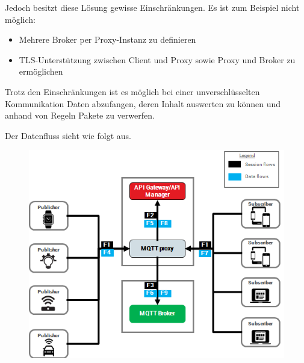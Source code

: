         Jedoch besitzt diese Lösung gewisse Einschränkungen.
        Es ist zum Beispiel nicht möglich:
        \begin{itemize}
            \item Mehrere Broker per Proxy-Instanz zu definieren
            \item TLS-Unterstützung zwischen Client und Proxy sowie Proxy und Broker zu ermöglichen
        \end{itemize}
        
        Trotz den Einschränkungen ist es möglich bei einer unverschlüsselten Kommunikation Daten abzufangen, deren Inhalt auswerten zu können und anhand von Regeln Pakete zu verwerfen.
        
        Der Datenfluss sieht wie folgt aus.
        \begin{figure}[h]%
            \centering
            \includegraphics[width=14cm]{tex/bilder/2_grundlagen/axway-mqtt-proxy02_short.png}
            \label{fig:axway-proxy}
        \end{figure}
